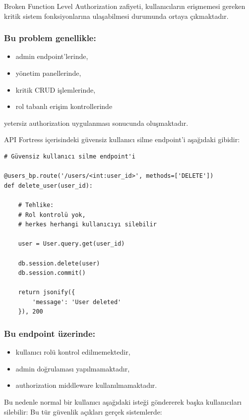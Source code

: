 Broken Function Level Authorization zafiyeti, kullanıcıların erişmemesi gereken kritik sistem fonksiyonlarına ulaşabilmesi durumunda ortaya çıkmaktadır.

\subsubsection{Bu problem genellikle:}

\begin{itemize}[leftmargin=*]
    \item admin endpoint’lerinde,
    \item yönetim panellerinde,
    \item kritik CRUD işlemlerinde,
    \item rol tabanlı erişim kontrollerinde
\end{itemize}

yetersiz authorization uygulanması sonucunda oluşmaktadır.

API Fortress içerisindeki güvensiz kullanıcı silme endpoint’i aşağıdaki gibidir:

\begin{lstlisting}
# Güvensiz kullanıcı silme endpoint'i

@users_bp.route('/users/<int:user_id>', methods=['DELETE'])
def delete_user(user_id):

    # Tehlike:
    # Rol kontrolü yok,
    # herkes herhangi kullanıcıyı silebilir

    user = User.query.get(user_id)

    db.session.delete(user)
    db.session.commit()

    return jsonify({
        'message': 'User deleted'
    }), 200
\end{lstlisting}

\subsubsection{Bu endpoint üzerinde:}

\begin{itemize}[leftmargin=*]
    \item kullanıcı rolü kontrol edilmemektedir,
    \item admin doğrulaması yapılmamaktadır,
    \item authorization middleware kullanılmamaktadır.
\end{itemize}

Bu nedenle normal bir kullanıcı aşağıdaki isteği göndererek başka kullanıcıları silebilir: Bu tür güvenlik açıkları gerçek sistemlerde:

